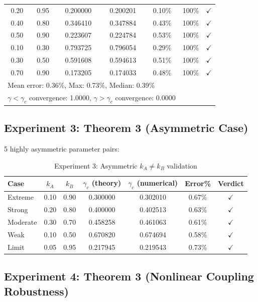 \documentclass[12pt,a4paper]{article}
\theoremstyle{definition}
\newcommand{\gamc}{\gamma_c}
\begin{document}
\begin{table}[htbp]
\begin{tabular}{ccccccc}
0.20 & 0.95 & 0.200000 & 0.200201 & 0.10\% & 100\% & $\checkmark$ \\
0.40 & 0.80 & 0.346410 & 0.347884 & 0.43\% & 100\% & $\checkmark$ \\
0.50 & 0.90 & 0.223607 & 0.224784 & 0.53\% & 100\% & $\checkmark$ \\
0.10 & 0.30 & 0.793725 & 0.796054 & 0.29\% & 100\% & $\checkmark$ \\
0.30 & 0.50 & 0.591608 & 0.594613 & 0.51\% & 100\% & $\checkmark$ \\
0.70 & 0.90 & 0.173205 & 0.174033 & 0.48\% & 100\% & $\checkmark$ \\
\midrule
\multicolumn{5}{l}{Mean error: 0.36\%, Max: 0.73\%, Median: 0.39\%} \\
\multicolumn{5}{l}{$\gamma < \gamc$ convergence: 1.0000, $\gamma > \gamc$ convergence: 0.0000} \\
\bottomrule
\end{tabular}
\end{table}

\subsection{Experiment 3: Theorem 3 (Asymmetric Case)}

5 highly asymmetric parameter pairs:

\begin{table}[htbp]
\centering
\caption{Experiment 3: Asymmetric $k_A \neq k_B$ validation}
\label{tab:exp3-en}
\begin{tabular}{lcccccc}
\toprule
Case & $k_A$ & $k_B$ & $\gamc$ (theory) & $\gamc$ (numerical) & Error\% & Verdict \\
\midrule
Extreme & 0.10 & 0.90 & 0.300000 & 0.302010 & 0.67\% & $\checkmark$ \\
Strong & 0.20 & 0.80 & 0.400000 & 0.402513 & 0.63\% & $\checkmark$ \\
Moderate & 0.30 & 0.70 & 0.458258 & 0.461063 & 0.61\% & $\checkmark$ \\
Weak & 0.10 & 0.50 & 0.670820 & 0.674694 & 0.58\% & $\checkmark$ \\
Limit & 0.05 & 0.95 & 0.217945 & 0.219543 & 0.73\% & $\checkmark$ \\
\bottomrule
\end{tabular}
\end{table}

\subsection{Experiment 4: Theorem 3 (Nonlinear Coupling Robustness)}
\end{document}

